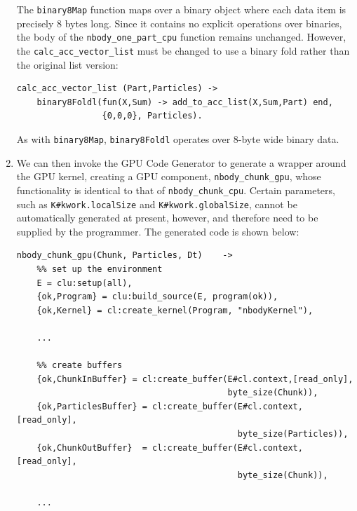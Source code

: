 \documentclass[final]{jfp1}
\makeatletter
\def\thickhrulefill{\leavevmode \leaders \hrule height 0.5pt \hfill \kern \z@}
\newcommand{\hrules}{\vspace{1.5ex}\thickhrulefill}
\newcommand{\hrulee}{\thickhrulefill\vspace{1.5ex}}
\makeatother
\begin{document}
\begin{enumerate}
\noindent
The \lstinline{binary8Map} function maps over a
binary object where each data item is precisely 8 bytes long.  Since it
contains no explicit operations over binaries, the body of the
\lstinline{nbody_one_part_cpu} function remains unchanged. However,
the \lstinline{calc_acc_vector_list} must be changed to use a binary fold
rather than the original list version:

\begin{lstlisting}
calc_acc_vector_list (Part,Particles) ->
    binary8Foldl(fun(X,Sum) -> add_to_acc_list(X,Sum,Part) end, 
                 {0,0,0}, Particles).
\end{lstlisting}

\noindent
As with \lstinline{binary8Map}, \lstinline{binary8Foldl} operates over
8-byte wide binary data.

\item We can then invoke the GPU Code Generator to generate a wrapper around
  the GPU kernel, creating a GPU component, \lstinline{nbody_chunk_gpu},
  whose functionality is identical to that of
  \lstinline{nbody_chunk_cpu}. Certain parameters, such as
  \lstinline{K#kwork.localSize} and \lstinline{K#kwork.globalSize}, cannot
  be automatically generated at present, however, and therefore
  need to be supplied by the programmer.  The
 generated code is shown below:

\begin{lstlisting}
nbody_chunk_gpu(Chunk, Particles, Dt)	 ->
    %% set up the environment
    E = clu:setup(all),
    {ok,Program} = clu:build_source(E, program(ok)),
    {ok,Kernel} = cl:create_kernel(Program, "nbodyKernel"),
    
    ...

    %% create buffers
    {ok,ChunkInBuffer} = cl:create_buffer(E#cl.context,[read_only],
                                          byte_size(Chunk)),
    {ok,ParticlesBuffer} = cl:create_buffer(E#cl.context,[read_only],
                                            byte_size(Particles)),
    {ok,ChunkOutBuffer}  = cl:create_buffer(E#cl.context,[read_only],
                                            byte_size(Chunk)),

    ...


\end{lstlisting}
\end{enumerate}
\end{document}
